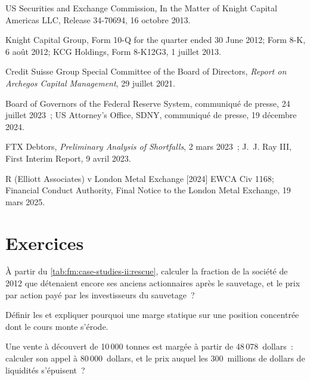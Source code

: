 \begin{omsources}
\item US Securities and Exchange Commission, In the Matter of Knight Capital Americas LLC, Release 34-70694, 16 octobre 2013.
\item Knight Capital Group, Form 10-Q for the quarter ended 30 June 2012; Form 8-K, 6 août 2012; KCG Holdings, Form 8-K12G3, 1 juillet 2013.
\item Credit Suisse Group Special Committee of the Board of Directors, \emph{Report on Archegos Capital Management}, 29 juillet 2021.
\item Board of Governors of the Federal Reserve System, communiqué de presse, 24 juillet 2023~; US Attorney's Office, SDNY, communiqué de presse, 19 décembre 2024.
\item FTX Debtors, \emph{Preliminary Analysis of Shortfalls}, 2 mars 2023~; J.~J. Ray III, First Interim Report, 9 avril 2023.
\item R (Elliott Associates) v London Metal Exchange [2024] EWCA Civ 1168; Financial Conduct Authority, Final Notice to the London Metal Exchange,
19 mars 2025.
\end{omsources}

\section{Exercices}

\begin{exercise}[$\star$]\label{exo:fm:case-studies-ii:1}
À partir du \cref{tab:fm:case-studies-ii:rescue}, calculer la fraction de la société de 2012 que détenaient encore ses anciens actionnaires après le sauvetage, et
le prix par action payé par les investisseurs du sauvetage~?
\end{exercise}

\begin{exercise}[$\star$]\label{exo:fm:case-studies-ii:2}
Définir les  et expliquer pourquoi une marge statique sur une position concentrée dont le cours monte s'érode.
\end{exercise}

\begin{exercise}[$\star$]\label{exo:fm:case-studies-ii:3}
Une vente à découvert de 10\,000 tonnes est margée à partir de 48\,078~dollars~: calculer son appel à 80\,000~dollars, et le prix auquel les 300~millions de dollars de liquidités s'épuisent~?
\end{exercise}

